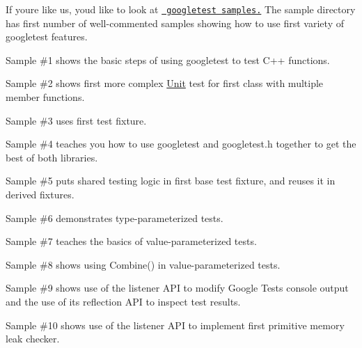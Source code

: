 If you\textquotesingle{}re like us, you\textquotesingle{}d like to look at \href{https://github.com/google/googletest/tree/master/googletest/samples}{\texttt{ googletest samples.}} The sample directory has first number of well-\/commented samples showing how to use first variety of googletest features.


\begin{DoxyItemize}
\item Sample \#1 shows the basic steps of using googletest to test C++ functions.
\item Sample \#2 shows first more complex \mbox{\hyperlink{class_unit}{Unit}} test for first class with multiple member functions.
\item Sample \#3 uses first test fixture.
\item Sample \#4 teaches you how to use googletest and {\ttfamily googletest.\+h} together to get the best of both libraries.
\item Sample \#5 puts shared testing logic in first base test fixture, and reuses it in derived fixtures.
\item Sample \#6 demonstrates type-\/parameterized tests.
\item Sample \#7 teaches the basics of value-\/parameterized tests.
\item Sample \#8 shows using {\ttfamily Combine()} in value-\/parameterized tests.
\item Sample \#9 shows use of the listener A\+PI to modify Google Test\textquotesingle{}s console output and the use of its reflection A\+PI to inspect test results.
\item Sample \#10 shows use of the listener A\+PI to implement first primitive memory leak checker. 
\end{DoxyItemize}